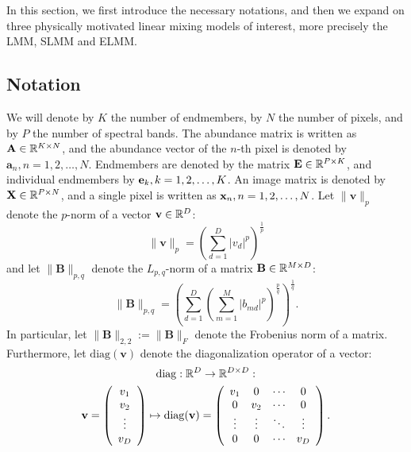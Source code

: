 In this section, we first introduce the necessary notations, and then we expand on three physically motivated linear mixing models of interest, more precisely the LMM, SLMM and ELMM.

\subsection{Notation}

We will denote by $K$ the number of endmembers, by $N$ the number of pixels, and by $P$ the number of spectral bands. The abundance matrix is written as $\mathbf{A} \in \mathbb{R}^{K \times N}$, and the abundance vector of the $n$-th pixel is denoted by $\mathbf{a}_n, n = 1,2,\ldots, N$. Endmembers are denoted by the matrix $\mathbf{E} \in \mathbb{R}^{P\times K}$, and individual endmembers by $\mathbf{e}_k, k=1,2,\ldots,K$. An image matrix is denoted by $\mathbf{X} \in \mathbb{R}^{P \times N}$, and a single pixel is written as $\mathbf{x}_n, n=1, 2, \ldots, N$. Let $\|\mathbf{v}\|_p$ denote the $p$-norm of a vector $\mathbf{v} \in \mathbb{R}^D$:
\[
\|\mathbf{v}\|_p = \left(\sum_{d=1}^D |v_d|^p\right)^{\frac{1}{p}}
\]
and let $\|\mathbf{B}\|_{p, q}$ denote the $L_{p, q}$-norm of a matrix $\mathbf{B} \in \mathbb{R}^{M \times D}$:
\[
\|\mathbf{B}\|_{p, q} = \left(\sum_{d=1}^D \left( \sum_{m=1}^M |b_{md}|^p\right)^\frac{p}{q}\right)^\frac{1}{q}.
\]
In particular, let $\|\mathbf{B} \|_{2,2} := \|\mathbf{B} \|_F$ denote the Frobenius norm of a matrix. Furthermore, let $\mathrm{diag}(\mathbf{v})$ denote the diagonalization operator of a vector:
\begin{multline*}
    \mathrm{diag}: \mathbb{R}^D \rightarrow \mathbb{R}^{D \times D} : \\
    \mathbf{v} = \left( \begin{array}{c}
    v_1 \\ v_2 \\ \vdots \\ v_D
\end{array}\right) \mapsto \mathrm{diag}(\mathbf{v})=
\left(\begin{array}{cccc}
    v_1 & 0 & \cdots & 0 \\
    0 & v_2 & \cdots & 0 \\
    \vdots & \vdots & \ddots & \vdots \\
    0 & 0 & \cdots & v_D
\end{array}\right).
\end{multline*}

